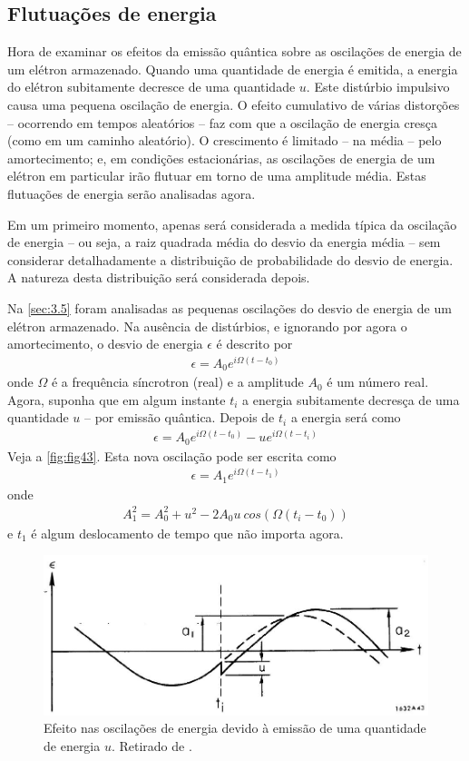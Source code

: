 \subsection{Flutuações de energia}
Hora de examinar os efeitos da emissão quântica sobre as oscilações de energia de um elétron armazenado. Quando uma quantidade de energia é emitida, a energia do elétron subitamente decresce de uma quantidade $u$. Este distúrbio impulsivo causa uma pequena oscilação de energia. O efeito cumulativo de várias distorções -- ocorrendo em tempos aleatórios -- faz com que a oscilação de energia cresça (como em um caminho aleatório). O crescimento é limitado -- na média -- pelo amortecimento; e, em condições estacionárias, as oscilações de energia de um elétron em particular irão flutuar em torno de uma amplitude média. Estas flutuações de energia serão analisadas agora.

Em um primeiro momento, apenas será considerada a medida típica da oscilação de energia -- ou seja, a raiz quadrada média do desvio da energia média -- sem considerar detalhadamente a distribuição de probabilidade do desvio de energia. A natureza desta distribuição será considerada depois.

Na \autoref{sec:3.5} foram analisadas as pequenas oscilações do desvio de energia de um elétron armazenado. Na ausência de distúrbios, e ignorando por agora o amortecimento, o desvio de energia $\epsilon$ é descrito por
\begin{align}
	\epsilon = A_0 e^{i\Omega(t-t_0)}
\end{align}
onde $\Omega$ é a frequência síncrotron (real) e a amplitude $A_0$ é um número real. Agora, suponha que em algum instante $t_i$ a energia subitamente decresça de uma quantidade $u$ -- por emissão quântica. Depois de $t_i$ a energia será como
\begin{align}
	\epsilon = A_0 e^{i\Omega(t-t_0)} - ue^{i\Omega(t-t_i)}
\end{align}
Veja a \autoref{fig:fig43}. Esta nova oscilação pode ser escrita como
\begin{align}
	\epsilon = A_1e^{i\Omega(t-t_1)}
\end{align}
onde
\begin{align}
	A_1^2 = A_0^2 + u^2 - 2A_0u\ cos(\Omega (t_i-t_0))
\end{align}
e $t_1$ é algum deslocamento de tempo que não importa agora.

\begin{figure}[!htb]
	\centering
	\includegraphics[width=0.9\linewidth]{./Figuras/fig43.jpeg}
	\caption{Efeito nas oscilações de energia devido à emissão de uma quantidade de energia $u$. Retirado de \cite{sands1970physics}.}
	\label{fig:fig43}
\end{figure}

